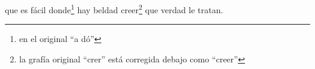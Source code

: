 que es fácil donde\footnote{\textsuperscript{}en el original ``a dó''} hay beldad
creer\footnote{\textsuperscript{}la grafía original ``crer'' está corregida debajo como ``creer''} que verdad le tratan.
